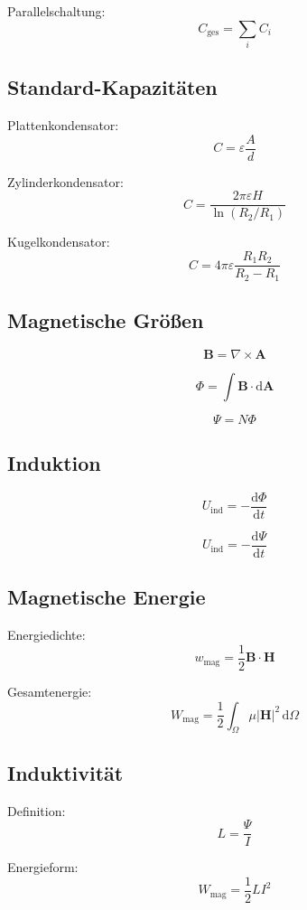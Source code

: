\documentclass[a4paper]{article}
\begin{document}
Parallelschaltung:
\[
C_\mathrm{ges} = \sum_i C_i
\]

\subsection{Standard-Kapazitäten}

Plattenkondensator:
\[
C = \varepsilon \frac{A}{d}
\]

Zylinderkondensator:
\[
C = \frac{2\pi \varepsilon H}{\ln(R_2/R_1)}
\]

Kugelkondensator:
\[
C = 4\pi \varepsilon \frac{R_1R_2}{R_2 - R_1}
\]

\subsection{Magnetische Größen}

\[
\mathbf{B} = \nabla \times \mathbf{A}
\]

\[
\Phi = \int \mathbf{B}\cdot \mathrm d\mathbf{A}
\]

\[
\Psi = N\Phi
\]

\subsection{Induktion}

\[
U_\mathrm{ind} = -\frac{\mathrm d\Phi}{\mathrm dt}
\]

\[
U_\mathrm{ind} = -\frac{\mathrm d\Psi}{\mathrm dt}
\]

\subsection{Magnetische Energie}

Energiedichte:
\[
w_\mathrm{mag} = \frac{1}{2}\mathbf{B}\cdot\mathbf{H}
\]

Gesamtenergie:
\[
W_\mathrm{mag}
=
\frac{1}{2}
\int_\Omega
\mu |\mathbf{H}|^2
\,\mathrm d\Omega
\]

\subsection{Induktivität}

Definition:
\[
L = \frac{\Psi}{I}
\]

Energieform:
\[
W_\mathrm{mag} = \frac{1}{2} L I^2
\]
\end{document}
